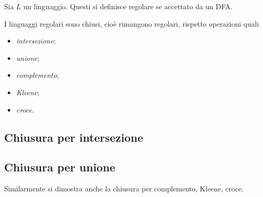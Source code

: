 \documentclass{subfiles}
\begin{document}
\begin{Definition*}
    Sia \(L\) un linguaggio. Questi si definisce regolare se accettato da un DFA.
\end{Definition*}

\noindent I linguaggi regolari sono chiusi, cioè rimangono regolari, rispetto operazioni quali
\begin{itemize}
    \item \emph{intersezione};
    \item \emph{unione};
    \item \emph{complemento};
    \item \emph{Kleene};
    \item \emph{croce}.
\end{itemize}

\subsection{Chiusura per intersezione}


\subsection{Chiusura per unione}


\begin{Note*}
    Similarmente si dimostra anche la chiusura per complemento, Kleene, croce.
\end{Note*}
\end{document}
